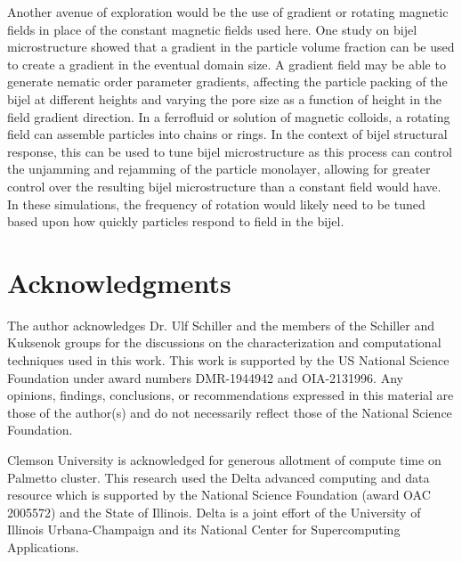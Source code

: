 Another avenue of exploration would be the use of gradient or rotating magnetic fields in place of the constant magnetic 
fields used here. One study on bijel microstructure showed that a gradient in the particle volume fraction can be used to 
create a gradient in the eventual domain size. A gradient field may be able to generate nematic order 
parameter gradients, affecting the particle packing of the bijel at different heights and varying the pore size as a function of 
height in the field gradient direction. In a ferrofluid or solution of magnetic colloids, a rotating field can assemble 
particles into chains or rings. In the context of bijel structural response, this can be used to tune bijel microstructure 
as this process can control the unjamming and rejamming of the particle monolayer, allowing for greater control over the 
resulting bijel microstructure than a constant field would have. In these simulations, the frequency of rotation would 
likely need to be tuned based upon how quickly particles respond to field in the bijel.



\section{Acknowledgments}

The author acknowledges Dr. Ulf Schiller and the members of the Schiller and Kuksenok groups for the discussions on 
the characterization and computational techniques used in this work. This work is supported by the US National Science 
Foundation under award numbers DMR-1944942 and OIA-2131996. Any opinions, findings, conclusions, or recommendations 
expressed in this material are those of the author(s) and do not necessarily reflect those of the National Science 
Foundation.  

Clemson University is acknowledged for generous allotment of compute time on Palmetto cluster. This research used the 
Delta advanced computing and data resource which is supported by the National Science Foundation (award OAC 2005572) 
and the State of Illinois. Delta is a joint effort of the University of Illinois Urbana-Champaign and its National 
Center for Supercomputing Applications. 

